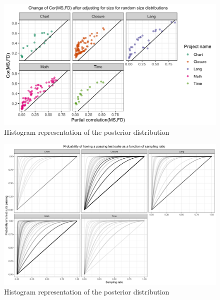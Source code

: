 \documentclass[10pt,letterpaper]{article}
\begin{document}
  \begin{figure}[ht!]
        \centering
        \includegraphics[scale=0.15]{figures/partial_cor_ms_fault_scatter.png}
        \caption{Histogram representation of the posterior distribution}
        \label{fig:par_cor_ms_scatter}
    \end{figure}



  \begin{figure}[ht!]
        \centering
        \includegraphics[scale=0.1]{figures/passing_suite_prob.png}
        \caption{Histogram representation of the posterior distribution}
        \label{fig:par_cor_ms_fd}
    \end{figure}
\end{document}
